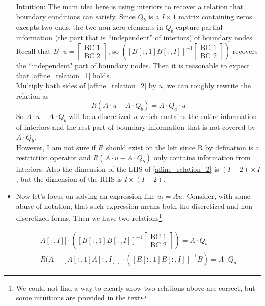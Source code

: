 \documentclass[11pt]{article}
\begin{document}
\begin{itemize}
Intuition: The main idea here is using interiors to recover a relation that boundary conditions can satisfy. Since $Q_b$ is a $I\times 1$ matrix containing zeros excepts two ends, the two non-zero elements in $Q_b$ capture partial information (the part that is ``independent'' of interiors) of boundary nodes.  Recall that $B\cdot u =\begin{bmatrix}
\text{BC 1}\\
\text{BC 2}
\end{bmatrix} $, so $\left([B[:, 1] B[:, I]]^{-1}\begin{bmatrix}
\text{BC 1}\\
\text{BC 2}
\end{bmatrix}\right)$ recovers the ``independent" part of boundary nodes. Then it is reasonable to expect that \eqref{affine_relation_1} holds.\\
Multiply both sides of \eqref{affine_relation_2} by $u$, we can roughly rewrite the relation as
\begin{equation}
R(A\cdot u-A\cdot Q_b) = A\cdot Q_a\cdot u
\end{equation}
So $A\cdot u-A\cdot Q_b$ will be a discretized $u$ which contains the entire information of interiors and the rest part of boundary information that is not covered by $A\cdot Q_b$. \\
However, I am not sure if $R$ should exist on the left since R by defination is a restriction operator and $R(A\cdot u-A\cdot Q_b)$ only contains information from interiors. Also the dimension of the LHS of \eqref{affine_relation_2} is $(I-2)\times I$, but the dimension of the RHS is $I\times (I-2)$.
\fi

\item Now let's focus on solving an expression like $u_t = A u$. Consider, with some abuse of notation, that such expression means both the discretized and non-discretized forms. Then we have two relations\footnote{We could not find a way to clearly show two relations above are correct, but some intuitions are provided in the text}:

\begin{align}
[A[:, 1] A[:, I]]\cdot\left([B[:, 1] B[:, I]]^{-1}\begin{bmatrix}
\text{BC 1}\\
\text{BC 2}
\end{bmatrix}\right) = A\cdot Q_b\label{affine_relation_1}\\
R(A-[A[:, 1] A[:, I]]\cdot([B[:, 1] B[:, I]]^{-1} B) = A\cdot Q_a\label{affine_relation_2}
\end{align}


\end{itemize}
\end{document}
